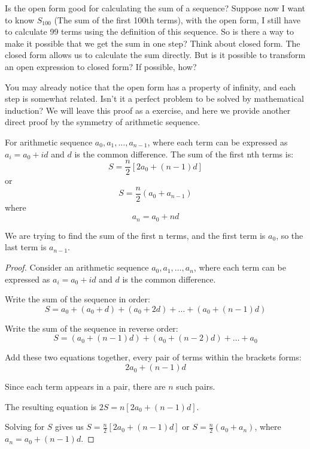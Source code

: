 \documentclass[
	12pt, %
	fleqn, %
	a4paper, %
]{LegrandOrangeBook}
\begin{document}
Is the open form good for calculating the sum of a sequence? Suppose now I want to know $S_{100}$ (The sum of the first 100th terms),
with the open form, I still have to calculate 99 terms using the definition of this sequence. So is there a way 
to make it possible that we get the sum in one step? Think about closed form. The closed form allows us to calculate
the sum directly. But is it possible to transform an open expression to closed form? If possible, how?

You may already notice that the open form has a property of infinity, and each step is somewhat related.
Isn't it a perfect problem to be solved by mathematical induction? We will leave this proof as a exercise, and here we provide another direct proof
by the symmetry of arithmetic sequence.
\begin{theorem}
    For  arithmetic sequence \( a_0, a_1, \ldots, a_{n-1} \), where each term can be expressed as \( a_i = a_0 + id \) and \( d \) is the common difference. The sum of the first nth terms is:
    \[ S = \frac{n}{2}[2a_0 + (n-1)d] \] or \[ S = \frac{n}{2}(a_0 + a_{n-1}) \] where \[ a_n = a_0 + nd \]
\end{theorem}
\begin{remark}
    We are trying to find the sum of the first n terms, and the first term is $a_0$, so the last term is
    $a_{n-1}$.
\end{remark}
\begin{proof}
    Consider an arithmetic sequence \( a_0, a_1, \ldots, a_n \), where each term can be expressed as \( a_i = a_0 + id \) and \( d \) is the common difference.
    \item Write the sum of the sequence in order:
\[
S = a_0 + (a_0 + d) + (a_0 + 2d) + \ldots + (a_0 + (n-1)d)
\]

\item Write the sum of the sequence in reverse order:
\[
S = (a_0 + (n-1)d) + (a_0 + (n-2)d) + \ldots + a_0
\]

\item Add these two equations together, every pair of terms within the brackets forms: \[ 2a_0 + (n-1)d \]

\item Since each term appears in a pair, there are \( n \) such pairs.

\item The resulting equation is \( 2S = n[2a_0 + (n-1)d] \).

\item Solving for \( S \) gives us \( S = \frac{n}{2}[2a_0 + (n-1)d] \) or \( S = \frac{n}{2}(a_0 + a_n) \), where \( a_n = a_0 + (n-1)d \).
\end{proof}
\end{document}
